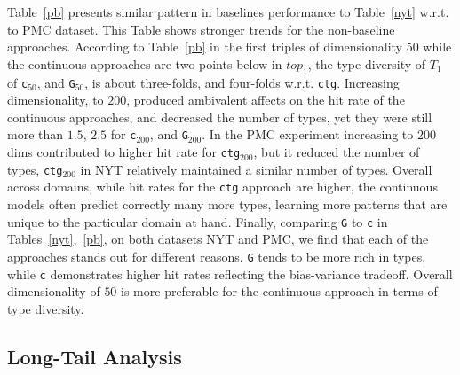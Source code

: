 \documentclass[11pt,a4paper]{article}
\begin{document}
Table~\ref{pb} presents similar pattern in baselines performance to Table~\ref{nyt} w.r.t. to PMC dataset. This Table shows stronger trends for the non-baseline approaches. According to Table~\ref{pb} in the first triples of dimensionality $50$ while the continuous approaches are two points below in $top_{1}$, the type diversity of $T_{1}$ of {\tt c}$_{50}$, and {\tt G}$_{50}$, is about three-folds, and four-folds w.r.t. {\tt ctg}. Increasing dimensionality, to $200$, produced ambivalent affects on the hit rate of the continuous approaches, and decreased the number of types, yet they were still more than $1.5$, $2.5$ for {\tt c}$_{200}$, and {\tt G}$_{200}$. In the PMC experiment increasing to $200$ dims contributed to higher hit rate for {\tt ctg}$_{200}$, but it reduced the number of types, {\tt ctg}$_{200}$ in NYT relatively maintained a similar number of types. Overall across domains, while hit rates for the {\tt ctg} approach are higher, the continuous models often predict correctly many more types, learning more patterns that are unique to the particular domain at hand. Finally, comparing {\tt G} to {\tt c} in Tables~\ref{nyt},~\ref{pb}, on both datasets NYT and PMC, we find that each of the approaches stands out for different reasons. {\tt G} tends to be more rich in types, while {\tt c} demonstrates higher hit rates reflecting the bias-variance tradeoff. Overall dimensionality of $50$ is more preferable for the continuous approach in terms of type diversity. 






\subsection{Long-Tail Analysis}\label{low_ana}
\end{document}
